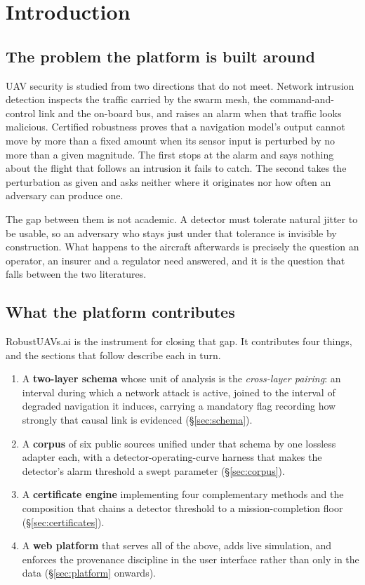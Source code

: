\documentclass[11pt,a4paper]{article}
\begin{document}
\tableofcontents
\newpage

\section{Introduction}

\subsection{The problem the platform is built around}
UAV security is studied from two directions that do not meet. Network intrusion
detection inspects the traffic carried by the swarm mesh, the command-and-control
link and the on-board bus, and raises an alarm when that traffic looks
malicious. Certified robustness proves that a navigation model's output cannot
move by more than a fixed amount when its sensor input is perturbed by no more
than a given magnitude. The first stops at the alarm and says nothing about the
flight that follows an intrusion it fails to catch. The second takes the
perturbation as given and asks neither where it originates nor how often an
adversary can produce one.

The gap between them is not academic. A detector must tolerate natural jitter to
be usable, so an adversary who stays just under that tolerance is invisible by
construction. What happens to the aircraft afterwards is precisely the question
an operator, an insurer and a regulator need answered, and it is the question
that falls between the two literatures.

\subsection{What the platform contributes}
RobustUAVs.ai is the instrument for closing that gap. It contributes four
things, and the sections that follow describe each in turn.

\begin{enumerate}[leftmargin=1.6em]
\item A \textbf{two-layer schema} whose unit of analysis is the
\emph{cross-layer pairing}: an interval during which a network attack is active,
joined to the interval of degraded navigation it induces, carrying a mandatory
flag recording how strongly that causal link is evidenced
(\S\ref{sec:schema}).
\item A \textbf{corpus} of six public sources unified under that schema by one
lossless adapter each, with a detector-operating-curve harness that makes the
detector's alarm threshold a swept parameter (\S\ref{sec:corpus}).
\item A \textbf{certificate engine} implementing four complementary methods and
the composition that chains a detector threshold to a mission-completion floor
(\S\ref{sec:certificates}).
\item A \textbf{web platform} that serves all of the above, adds live
simulation, and enforces the provenance discipline in the user interface rather
than only in the data (\S\ref{sec:platform} onwards).
\end{enumerate}
\end{document}

